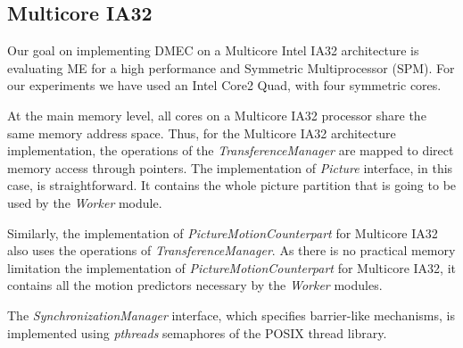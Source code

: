 \subsection{Multicore IA32}

Our goal on implementing DMEC on a Multicore Intel IA32 
architecture is evaluating ME for a high performance and Symmetric Multiprocessor (SPM).
% 
For our experiments we have used an Intel Core2 Quad, with four symmetric
cores.

At the main memory level,
all cores on a Multicore IA32 processor 
share the same memory address space.
Thus, for the Multicore IA32 architecture implementation,
the operations of the \emph{TransferenceManager} are mapped to direct memory access
through pointers.
The implementation of \emph{Picture} interface, in this case,
is straightforward. It contains the whole picture partition that is going to
be used by the \emph{Worker} module.

Similarly, the implementation of \emph{PictureMotionCounterpart} for
Multicore IA32  also uses the operations of \emph{TransferenceManager}.
As there is no practical memory limitation the implementation of 
\emph{PictureMotionCounterpart} for Multicore IA32, it contains all the
motion predictors necessary by the \emph{Worker} modules.

The \emph{SynchronizationManager} interface, which specifies barrier-like
mechanisms, is implemented using \emph{pthreads} semaphores of the
POSIX thread library.

